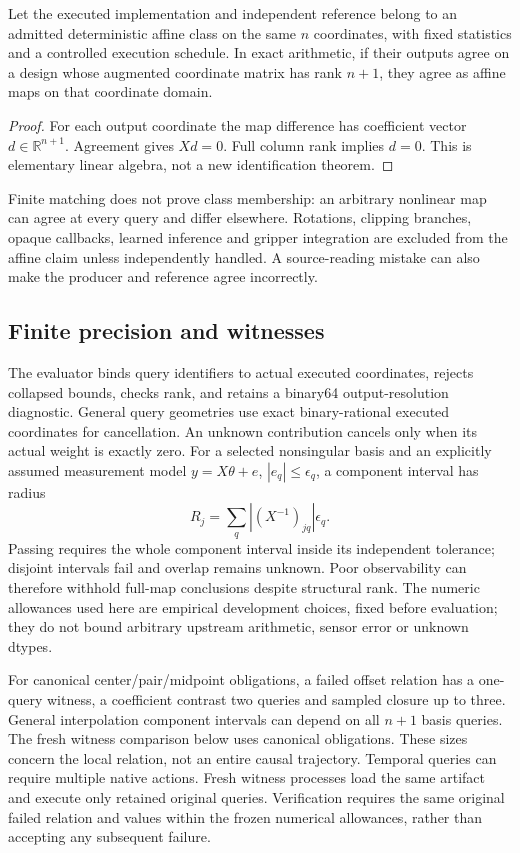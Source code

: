 \begin{proposition}
Let the executed implementation and independent reference belong to an admitted deterministic affine class on the same $n$ coordinates, with fixed statistics and a controlled execution schedule. In exact arithmetic, if their outputs agree on a design whose augmented coordinate matrix has rank $n+1$, they agree as affine maps on that coordinate domain.
\end{proposition}
\begin{proof}
For each output coordinate the map difference has coefficient vector $d\in\mathbb{R}^{n+1}$. Agreement gives $Xd=0$. Full column rank implies $d=0$. This is elementary linear algebra, not a new identification theorem.
\end{proof}

Finite matching does not prove class membership: an arbitrary nonlinear map can agree at every query and differ elsewhere. Rotations, clipping branches, opaque callbacks, learned inference and gripper integration are excluded from the affine claim unless independently handled. A source-reading mistake can also make the producer and reference agree incorrectly.

\subsection{Finite precision and witnesses}
The evaluator binds query identifiers to actual executed coordinates, rejects collapsed bounds, checks rank, and retains a binary64 output-resolution diagnostic. General query geometries use exact binary-rational executed coordinates for cancellation. An unknown contribution cancels only when its actual weight is exactly zero. For a selected nonsingular basis and an explicitly assumed measurement model $y=X\theta+e$, $|e_q|\leq\epsilon_q$, a component interval has radius
\begin{equation}
 R_j=\sum_q |(X^{-1})_{jq}|\epsilon_q.
\end{equation}
Passing requires the whole component interval inside its independent tolerance; disjoint intervals fail and overlap remains unknown. Poor observability can therefore withhold full-map conclusions despite structural rank. The numeric allowances used here are empirical development choices, fixed before evaluation; they do not bound arbitrary upstream arithmetic, sensor error or unknown dtypes.

For canonical center/pair/midpoint obligations, a failed offset relation has a one-query witness, a coefficient contrast two queries and sampled closure up to three. General interpolation component intervals can depend on all $n+1$ basis queries. The fresh witness comparison below uses canonical obligations. These sizes concern the local relation, not an entire causal trajectory. Temporal queries can require multiple native actions. Fresh witness processes load the same artifact and execute only retained original queries. Verification requires the same original failed relation and values within the frozen numerical allowances, rather than accepting any subsequent failure.

